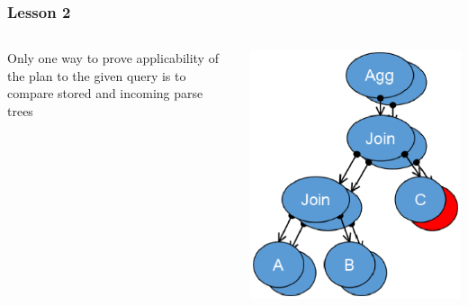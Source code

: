 \documentclass{beamer}
\begin{document}
\begin{frame}[fragile]\frametitle{Lesson 2}
\begin{columns}\begin{column}{0.5\textwidth}
Only one way to prove applicability of the plan to the given query is to compare stored and incoming parse trees
\end{column}\begin{column}{0.5\textwidth}
  \begin{center}
    \includegraphics[scale=0.5]{compare_trees}
  \end{center}
\end{column}\end{columns}
\end{frame}
\end{document}
